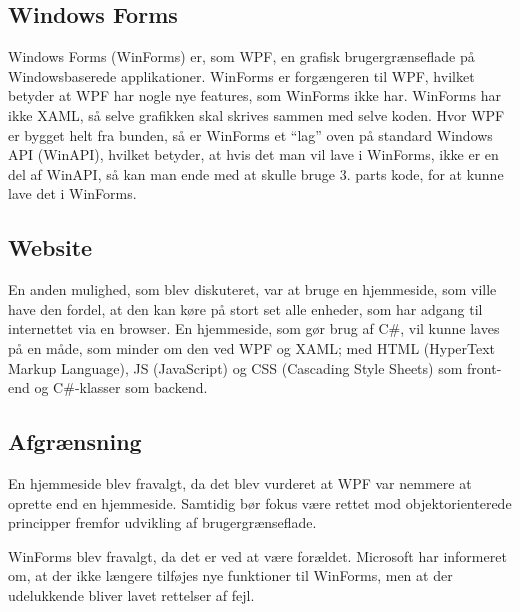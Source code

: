 \subsection{Windows Forms}
Windows Forms (WinForms) er, som \ac{WPF}, en grafisk brugergrænseflade på Windowsbaserede applikationer. 
WinForms er forgængeren til WPF, hvilket betyder at WPF har nogle nye features, som WinForms ikke har.
WinForms har ikke XAML, så selve grafikken skal skrives sammen med selve koden. 
Hvor WPF er bygget helt fra bunden, så er WinForms et ``lag'' oven på standard Windows API (WinAPI), hvilket betyder, at hvis det man vil lave i WinForms, ikke er en del af WinAPI, så kan man ende med at skulle bruge 3. parts kode, for at kunne lave det i WinForms.\citep{winforms2}

\subsection{Website}
En anden mulighed, som blev diskuteret, var at bruge en hjemmeside, som ville have den fordel, at den kan køre på stort set alle enheder, som har adgang til internettet via en browser. 
En hjemmeside, som gør brug af C\#, vil kunne laves på en måde, som minder om den ved WPF og XAML; med HTML (HyperText Markup Language), JS (JavaScript) og CSS (Cascading Style Sheets) som front-end og C\#-klasser som backend. 

\subsection{Afgrænsning}
En hjemmeside blev fravalgt, da det blev vurderet at WPF var nemmere at oprette end en hjemmeside.
Samtidig bør fokus være rettet mod objektorienterede principper fremfor udvikling af brugergrænseflade. 

WinForms blev fravalgt, da det er ved at være forældet.
Microsoft har informeret om, at der ikke længere tilføjes nye funktioner til WinForms, men at der udelukkende bliver lavet rettelser af fejl.\citep{winforms}

